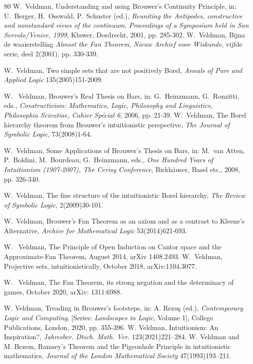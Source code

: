 \documentclass[a4paper]{amsart}
\theoremstyle{plain}
\begin{document}
\begin{thebibliography}{80}
  W.~Veldman, Understanding and using Brouwer's Continuity
 Principle, in: U.~Berger, H.~Osswald, P.~Schuster (ed.), \textit{Reuniting the
 Antipodes, constructive and nonstandard views of the continuum, Proceedings of a
 Symposium held in San Servolo/Venice, 1999}, Kluwer, Dordrecht, 2001,
 pp. 285-302.
  W.~Veldman, Bijna de waaierstelling {\it Almost the Fan Theorem}, \textit{Nieuw Archief voor Wiskunde}, vijfde serie, deel 2(2001), pp. 330-339.
 


 W.~Veldman, Two simple sets that are not positively Borel, {\em Annals of Pure and Applied Logic} 135(2005)151-2009.


 W. ~Veldman, Brouwer's Real Thesis on Bars, in: G.~Heinzmann, G.~Ronzitti, eds., {\em Constructivism: Mathematics, Logic, Philosophy and Linguistics,  Philosophia Scientiae, Cahier Sp\'ecial 6}, 2006, pp. 21-39.
 W.~Veldman, The Borel hierarchy theorem from Brouwer's intuitionistic perspective, {\it The Journal of Symbolic Logic}, 73(2008)1-64.


W.~Veldman, Some Applications of Brouwer's Thesis on Bars, in: M.~van Atten, P.~Boldini, M.~Bourdeau, G.~Heinzmann, eds., \textit{One Hundred Years of Intuitionism (1907-2007), The Cerisy Conference}, Birkh\"auser, Basel etc., 2008, pp. 326-340.

 W.~Veldman, The fine structure of the intuitionistic Borel hierarchy, {\it The Review of Symbolic Logic}, 2(2009)30-101.

W.~Veldman,  Brouwer's Fan Theorem as an axiom and as a contrast to Kleene's Alternative,   \textit{Archive for Mathematical Logic} 53(2014)621-693.


W. ~Veldman, The Principle of Open Induction on Cantor space  and the Approximate-Fan Theorem,  August 2014, arXiv 1408.2493.
 W.~Veldman, Projective sets, intuitionistically, October 2018, arXiv:1104.3077.

 W. ~Veldman, The Fan Theorem, its strong negation and the determinacy of games, October 2020, arXiv: 1311:6988.                                                                                                         


	
	 W. Veldman, Treading in Brouwer's footsteps, in: A. Rezu\c{s} (ed.), {\it Contemporary Logic and Computing}, [Series: {\it Landscapes in Logic}, Volume 1], College Publications, London, 2020, pp. 355-396.
W. Veldman, Intuitionism: An Inspiration?, {\it Jahresber. Dtsch. Math. Ver.} 123(2021)221–284.
	W. Veldman and M. Bezem, 
	 Ramsey's Theorem and the Pigeonhole Principle in intuitionistic mathematics, 
 	{\it Journal of the London Mathematical Society}  47(1993)193--211.
 
 
 
 \end{thebibliography}
\end{document}
